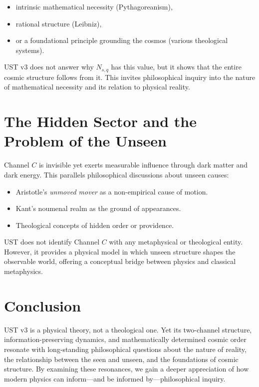 \documentclass[12pt]{article}
\begin{document}
\begin{itemize}
\item intrinsic mathematical necessity (Pythagoreanism),
\item rational structure (Leibniz),
\item or a foundational principle grounding the cosmos (various theological
systems).
\end{itemize}

UST v3 does not answer why $N_{s,q}$ has this value, but it shows that the
entire cosmic structure follows from it. This invites philosophical inquiry
into the nature of mathematical necessity and its relation to physical
reality.


\section{The Hidden Sector and the Problem of the Unseen}

Channel $C$ is invisible yet exerts measurable influence through dark matter
and dark energy. This parallels philosophical discussions about unseen causes:

\begin{itemize}
\item Aristotle's \emph{unmoved mover} as a non-empirical cause of motion.
\item Kant's noumenal realm as the ground of appearances.
\item Theological concepts of hidden order or providence.
\end{itemize}

UST does not identify Channel $C$ with any metaphysical or theological entity.
However, it provides a physical model in which unseen structure shapes the
observable world, offering a conceptual bridge between physics and classical
metaphysics.


\section{Conclusion}

UST v3 is a physical theory, not a theological one. Yet its two-channel
structure, information-preserving dynamics, and mathematically determined
cosmic order resonate with long-standing philosophical questions about the
nature of reality, the relationship between the seen and unseen, and the
foundations of cosmic structure. By examining these resonances, we gain a
deeper appreciation of how modern physics can inform---and be informed
by---philosophical inquiry.
\end{document}
